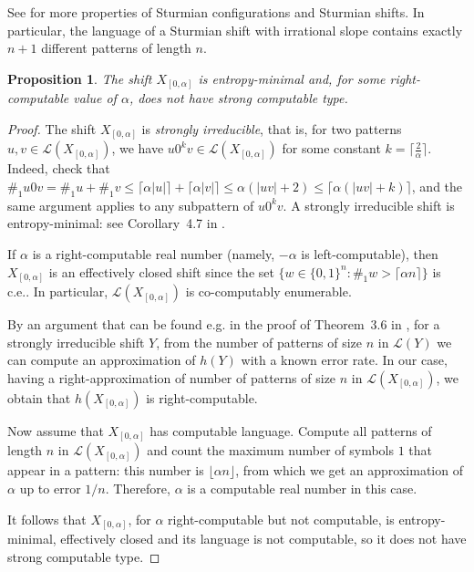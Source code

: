 \documentclass[french,american]{article}
\theoremstyle{plain}
\newtheorem{proposition}[theorem]{Proposition}
\theoremstyle{definition}
\theoremstyle{remark}
\theoremstyle{plain}
\begin{document}
See \cite[Chapter 2]{lothaire2002algebraic} for more properties of
Sturmian configurations and Sturmian shifts. In particular, the language
of a Sturmian shift with irrational slope contains exactly $n+1$
different patterns of length $n$.
\begin{proposition}
\label{Prop:entropyminimal} The shift $X_{[0,\alpha]}$ is entropy-minimal and, for some right-computable value of $\alpha$, does not have strong computable type.
\end{proposition}

\begin{proof}
The shift $X_{[0,\alpha]}$ is \emph{strongly irreducible}, that is, for two patterns $u,v\in \mathcal L(X_{[0,\alpha]})$, we have $u0^kv\in \mathcal L(X_{[0,\alpha]})$ for some constant $k = \lceil \frac2\alpha\rceil$. Indeed, check that $\#_{1}u0v= \#_{1}u+\#_{1}v \leq \lceil\alpha |u| \rceil + \lceil\alpha |v|\rceil \leq \alpha(|uv|+2) \leq \lceil\alpha (|uv|+k) \rceil$, and the same argument applies to any subpattern of $u0^kv$. A strongly irreducible shift is entropy-minimal: see Corollary~4.7 in \cite{fiorenzi2004semi}.

If $\alpha$ is a right-computable real number (namely, $-\alpha$
is left-computable), then $X_{[0,\alpha]}$ is an effectively closed shift
since the set $\{w\in\{0,1\}^{n}:\#_{1}w>\lceil\alpha n\rceil\}$
is c.e.. In particular, $\mathcal L(X_{[0,\alpha]})$ is co-computably enumerable.

By an argument that can be found e.g. in the proof of Theorem~3.6 in \cite{gangloff2016effect}, for a
strongly irreducible shift $Y$, from the number of patterns of size $n$ in $\mathcal L(Y)$ we can compute
an approximation of $h(Y)$ with a known error rate.
In our case, having a right-approximation of number of patterns of size $n$ in $\mathcal L(X_{[0,\alpha]})$, we obtain that
$h(X_{[0,\alpha]})$ is right-computable.

Now assume that $X_{[0,\alpha]}$ has computable language.
Compute all patterns of length $n$ in $\mathcal{L}(X_{[0,\alpha]})$
and count the maximum number of symbols $1$ that appear in a pattern:
this number is $\lfloor\alpha n\rfloor$, from which we get an approximation
of $\alpha$ up to error $1/n$. Therefore, $\alpha$ is a computable
real number in this case.

It follows that $X_{[0,\alpha]}$, for $\alpha$ right-computable
but not computable, is entropy-minimal, effectively closed and its language
is not computable, so it does not have strong computable type.
\end{proof}
\end{document}
